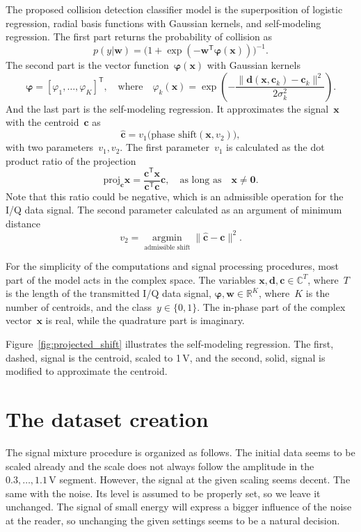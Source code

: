 \documentclass[12pt]{article}
\newcommand{\bw}{\mathbf{w}}
\newcommand{\bwT}{\mathbf{w}^\mathsf{T}}
\newcommand{\T}{^\mathsf{T}}
\newcommand{\bphi}{\boldsymbol{\varphi}}
\newcommand{\bx}{\mathbf{x}}
\newcommand{\bc}{\mathbf{c}}
\newcommand{\bd}{\mathbf{d}}
\begin{document}
The proposed collision detection classifier model is the superposition of logistic regression, radial basis functions with Gaussian kernels, and self-modeling regression. The first part returns the probability of collision as
\[
p(y|\bw) =\bigl( 1+\exp(-\bwT\bphi(\bx)) \bigr)^{-1}.
\]
The second part is the vector function~$\bphi(\bx)$ with Gaussian kernels 
\[
\bphi = [\varphi_1,\ldots,\varphi_K]\T, \quad \text{where} \quad \varphi_k(\bx) =  \exp\left(-\frac{\|\bd(\bx, \bc_k) - \bc_k\|^2}{2\sigma_k^2}\right).
\]
And the last part is the self-modeling regression. It approximates the signal~$\bx$ with the centroid~$\bc$ as
\[
\hat{\bc} = v_1 \bigl( \text{phase shift}(\bx, v_2)\bigr),
\]  
with two parameters~$v_1,v_2$. The first parameter~$v_1$ is calculated as the dot product ratio of the projection 
\[
\text{proj}_\bc \bx = \frac{\bc\T\bx}{\bc\T\bc}\bc, \quad \text{as long as} \quad \bx \neq \boldsymbol{0}.
\]
Note that this ratio could be negative, which is an admissible operation for the I/Q data signal. The second parameter calculated as an argument of minimum distance
\[v_2 =\mathop{\arg\min}\limits_{\text{admissible shift}}\|\hat{\bc}-\bc\|^2.\]

For the simplicity of the computations and signal processing procedures, most part of the model acts in the complex space. The variables $\bx, \bd, \bc \in \mathbb{C}^T$,
where~$T$ is the length of the transmitted I/Q data signal, 
$\bphi, \bw \in \mathbb{R}^K$,
where~$K$ is the number of centroids, and the class~$y\in\{0,1\}.$ The in-phase part of the complex vector~$\bx$ is real, while the quadrature part is imaginary.

Figure~\ref{fig:projected_shift} illustrates the self-modeling regression. The first, dashed, signal is the centroid, scaled to 1\,V, and the second, solid, signal is modified to approximate the centroid.

\section{The dataset creation}
The signal mixture procedure is organized as follows. The initial data seems to be scaled already and the scale does not always follow the amplitude in the $0.3,\ldots,1.1$\,V segment. However, the signal at the given scaling seems decent. The same with the noise. Its level is assumed to be properly set, so we leave it unchanged. The signal of small energy will express a bigger influence of the noise at the reader, so unchanging the given settings seems to be a natural decision. 
\end{document}
